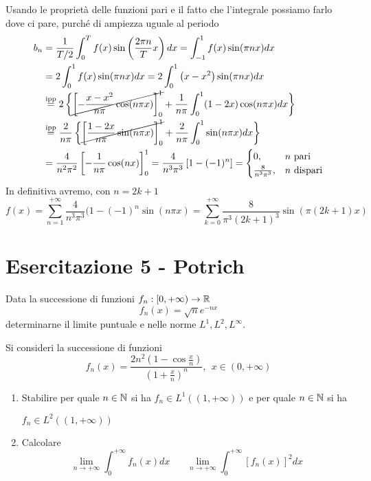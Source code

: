 Usando le proprietà delle funzioni pari e il fatto che l'integrale possiamo farlo dove ci pare, purché di ampiezza uguale al periodo
\begin{equation*}
\begin{aligned}
b_{n} & =\frac{1}{T/2}\int ^{T}_{0} f(x)\sin\left(\frac{2\pi n}{T} x\right) dx=\int ^{1}_{-1} f(x)\sin( \pi nx) dx\\
 & =2\int ^{1}_{0} f(x)\sin( \pi nx) dx=2\int ^{1}_{0}\left( x-x^{2}\right)\sin( \pi nx) dx\\
 & \overset{\text{ipp}}{=} 2\left\{\cancel{\left[ -\frac{x-x^{2}}{n\pi }\cos( n\pi x)\right]^{1}_{0}} +\frac{1}{n\pi }\int ^{1}_{0}( 1-2x)\cos( n\pi x) dx\right\}\\
 & \overset{\text{ipp}}{=}\frac{2}{n\pi }\left\{\cancel{\left[\frac{1-2x}{n\pi }\sin( n\pi x)\right]^{1}_{0}} +\frac{2}{n\pi }\int ^{1}_{0}\sin( n\pi x) dx\right\}\\
 & =\frac{4}{n^{2} \pi ^{2}}\left[ -\frac{1}{n\pi }\cos (nx)\right]^{1}_{0} =\frac{4}{n^{3} \pi ^{3}}\left[ 1-( -1)^{n}\right] =\begin{cases}
0, & n\ \text{pari}\\
\frac{8}{n^{3} \pi ^{3}} , & n\ \text{dispari}
\end{cases}
\end{aligned}
\end{equation*}
In definitiva avremo, con $n=2k+1$
\begin{equation*}
f(x)=\sum ^{+\infty }_{n=1}\frac{4}{n^{3} \pi ^{3}} (1-( -1)^{n}\sin (n\pi x)=\sum ^{+\infty }_{k=0}\frac{8}{\pi ^{3} (2k+1)^{3}}\sin (\pi (2k+1)x)
\end{equation*}
\chapter{Esercitazione 5 - Potrich}
\ParteEsercizi
\Esercizio{}

Data la successione di funzioni $f_{n} :[ 0,+\infty )\rightarrow \mathbb{R} $
\begin{equation*}
f_{n}( x) =\sqrt{n} e^{-nx}
\end{equation*}
determinarne il limite puntuale e nelle norme $L^{1} ,L^{2} ,L^{\infty }$.
\Esercizio{}

Si consideri la successione di funzioni
\begin{equation*}
f_{n} (x)=\frac{2n^{2}\left( 1-\cos\frac{x}{n}\right)}{\left( 1+\frac{x}{n}\right)^{n}} ,\ \ x\in (0,+\infty )
\end{equation*}
\begin{enumerate}
\item Stabilire per quale $n\in \mathbb{N} $ si ha $f_{n} \in L^{1}(( 1,+\infty ))$ e per quale $n\in \mathbb{N} $ si ha 

$f_{n} \in L^{2}(( 1,+\infty ))$
\item Calcolare\begin{equation*}
\lim\limits _{n\rightarrow +\infty }\int ^{+\infty }_{0} f_{n}( x) dx\ \ \ \ \ \ \ \ \lim\limits _{n\rightarrow +\infty }\int ^{+\infty }_{0}[ f_{n}( x)]^{2} dx
\end{equation*}
\end{enumerate}
\Esercizio{}


